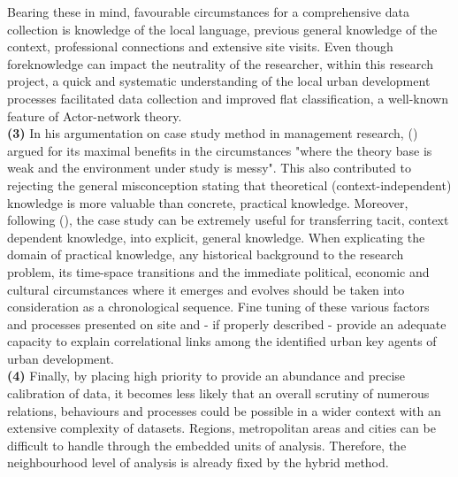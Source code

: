 \documentclass[11pt]{report}
\begin{document}
{{{{Bearing these in mind, favourable circumstances for a comprehensive data collection is knowledge of the local language, previous general knowledge of the context, professional connections and extensive site visits. Even though foreknowledge can impact the neutrality of the researcher, within this research project, a quick and systematic understanding of the local urban development processes facilitated data collection and improved flat classification, a well-known feature of Actor-network theory. 
\\

\textbf{(3)} In his argumentation on case study method in management research, (\href{Harrison}{\citealt{partington_case_2002}}) argued for its maximal benefits in the circumstances "where the theory base is weak and the environment under study is messy".
This also contributed to rejecting the general misconception stating that theoretical (context-independent) knowledge is more valuable than concrete, practical knowledge. Moreover, following (\href{Flyvbjerg}{\citealt{flyvbjerg_five_2006}}), the case study can be extremely useful for transferring tacit, context dependent knowledge, into explicit, general knowledge. When explicating the domain of practical knowledge, any historical background to the research problem, its time-space transitions and the immediate political, economic and cultural circumstances where it emerges and evolves should be taken into consideration as a chronological sequence. Fine tuning of these various factors and processes presented on site and - if properly described - provide an adequate capacity to explain correlational links among the identified urban key agents of urban development.
\\

\textbf{(4) }Finally, by placing high priority to provide an abundance and precise calibration of data, it becomes less likely that an overall scrutiny of numerous relations, behaviours and processes could be possible in a wider context with an extensive complexity of datasets. Regions, metropolitan areas and cities can be difficult to handle through the embedded units of analysis. Therefore, the neighbourhood level of analysis is already fixed by the hybrid method.
\\

}}}}
\end{document}
